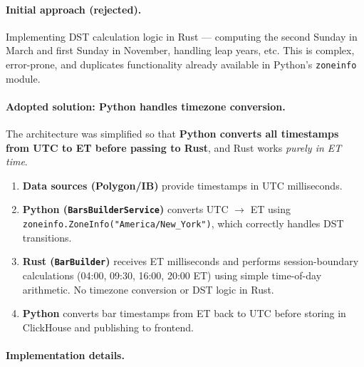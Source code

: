 \documentclass[a4paper, 11pt]{article}
\begin{document}
\paragraph{Initial approach (rejected).}
Implementing DST calculation logic in Rust --- computing the second Sunday in
March and first Sunday in November, handling leap years, etc.  This is complex,
error-prone, and duplicates functionality already available in Python's
\texttt{zoneinfo} module.

\paragraph{Adopted solution: Python handles timezone conversion.}
The architecture was simplified so that \textbf{Python converts all timestamps
from UTC to ET before passing to Rust}, and Rust works \emph{purely in ET time}.

\begin{enumerate}[nosep]
    \item \textbf{Data sources (Polygon/IB)} provide timestamps in UTC milliseconds.
    \item \textbf{Python (\texttt{BarsBuilderService})} converts UTC $\to$ ET using
          \texttt{zoneinfo.ZoneInfo("America/New\_York")}, which correctly handles
          DST transitions.
    \item \textbf{Rust (\texttt{BarBuilder})} receives ET milliseconds and performs
          session-boundary calculations (04:00, 09:30, 16:00, 20:00 ET) using simple
          time-of-day arithmetic.  No timezone conversion or DST logic in Rust.
    \item \textbf{Python} converts bar timestamps from ET back to UTC before storing
          in ClickHouse and publishing to frontend.
\end{enumerate}

\paragraph{Implementation details.}
\end{document}
